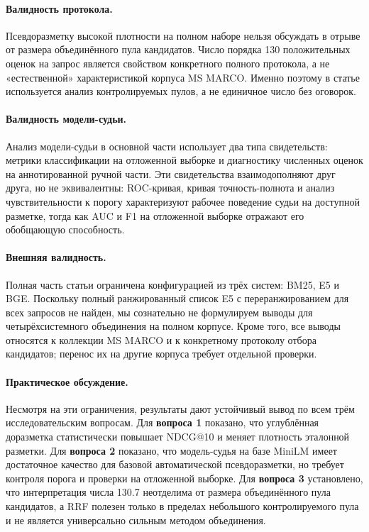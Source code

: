 \documentclass[10pt,a4paper,twocolumn]{article}
\begin{document}
\paragraph{Валидность протокола.} Псевдоразметку высокой плотности на полном наборе нельзя обсуждать в отрыве от размера объединённого пула кандидатов. Число порядка 130 положительных оценок на запрос является свойством конкретного полного протокола, а не «естественной» характеристикой корпуса MS MARCO. Именно поэтому в статье используется анализ контролируемых пулов, а не единичное число без оговорок.

\paragraph{Валидность модели-судьи.} Анализ модели-судьи в основной части использует два типа свидетельств: метрики классификации на отложенной выборке и диагностику численных оценок на аннотированной ручной части. Эти свидетельства взаимодополняют друг друга, но не эквивалентны: ROC-кривая, кривая точность-полнота и анализ чувствительности к порогу характеризуют рабочее поведение судьи на доступной разметке, тогда как AUC и F1 на отложенной выборке отражают его обобщающую способность.

\paragraph{Внешняя валидность.} Полная часть статьи ограничена конфигурацией из трёх систем: BM25, E5 и BGE. Поскольку полный ранжированный список E5 с переранжированием для всех запросов не найден, мы сознательно не формулируем выводы для четырёхсистемного объединения на полном корпусе. Кроме того, все выводы относятся к коллекции MS MARCO и к конкретному протоколу отбора кандидатов; перенос их на другие корпуса требует отдельной проверки.

\paragraph{Практическое обсуждение.} Несмотря на эти ограничения, результаты дают устойчивый вывод по всем трём исследовательским вопросам. Для \textbf{вопроса 1} показано, что углублённая доразметка статистически повышает NDCG@10 и меняет плотность эталонной разметки. Для \textbf{вопроса 2} показано, что модель-судья на базе MiniLM имеет достаточное качество для базовой автоматической псевдоразметки, но требует контроля порога и проверки на отложенной выборке. Для \textbf{вопроса 3} установлено, что интерпретация числа 130.7 неотделима от размера объединённого пула кандидатов, а RRF полезен только в пределах небольшого контролируемого пула и не является универсально сильным методом объединения.
\end{document}
